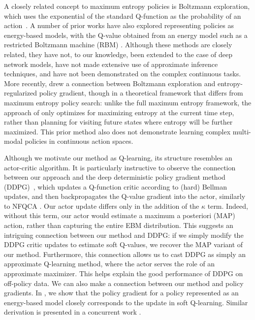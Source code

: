 \documentclass{article}
\begin{document}
%
%
A closely related concept to maximum entropy policies is Boltzmann exploration, which uses the exponential of the standard Q-function as the probability of an action~\cite{kaelbling1996reinforcement}.
A number of prior works have also explored representing policies as energy-based models, with the Q-value obtained from an energy model such as a restricted Boltzmann machine (RBM) \cite{sallans2004reinforcement,elfwing2010free,otsuka2010free,heess2012actor}. Although these methods are closely related, they have not, to our knowledge, been extended to the case of deep network models, have not made extensive use of approximate inference techniques, and have not been demonstrated on the complex continuous tasks. More recently, \citet{o2016pgq} drew a connection between Boltzmann exploration and entropy-regularized policy gradient, though in a theoretical framework that differs from maximum entropy policy search: unlike the full maximum entropy framework, the approach of \citet{o2016pgq} only optimizes for maximizing entropy at the current time step, rather than planning for visiting future states where entropy will be further maximized. This prior method also does not demonstrate learning complex multi-modal policies in continuous action spaces.

Although we motivate our method as Q-learning, its structure resembles an actor-critic algorithm. It is particularly instructive to observe the connection between our approach and the deep deterministic policy gradient method (DDPG)~\cite{lillicrap2015continuous}, which updates a Q-function critic according to (hard) Bellman updates, and then backpropagates the Q-value gradient into the actor, similarly to NFQCA \cite{hafner2011reinforcement}. Our actor update differs only in the addition of the $\kappa$ term. Indeed, without this term, our actor would estimate a maximum a posteriori (MAP) action, rather than capturing the entire EBM distribution. This suggests an intriguing connection between our method and DDPG: if we simply modify the DDPG critic updates to estimate soft Q-values, we recover the MAP variant of our method. Furthermore, this connection allows us to cast DDPG as simply an approximate Q-learning method, where the actor serves the role of an approximate maximizer. This helps explain the good performance of DDPG on off-policy data. We can also make a connection between our method and policy gradients. In , we show that the policy gradient for a policy represented as an energy-based model closely corresponds to the update in soft Q-learning. Similar derivation is presented in a concurrent work \cite{schulman2017equivalence}.
\end{document}
